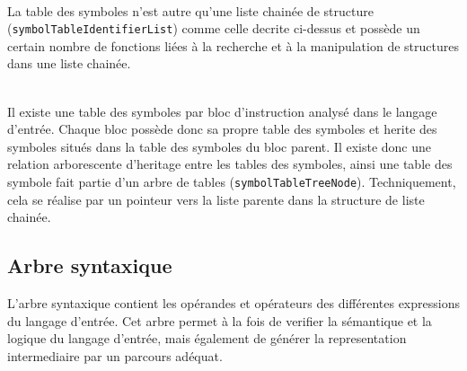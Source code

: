 ~~\\
La table des symboles n'est autre qu'une liste chainée de structure (\verb?symbolTableIdentifierList?) comme celle decrite ci-dessus et possède un certain nombre de fonctions liées à la recherche et à la manipulation de structures dans une liste chainée.

~~\\
Il existe une table des symboles par bloc d'instruction analysé dans le langage d'entrée. Chaque bloc possède donc sa propre table des symboles et herite des symboles situés dans la table des symboles du bloc parent. Il existe donc une relation arborescente d'heritage entre les tables des symboles, ainsi une table des symbole fait partie d'un arbre de tables (\verb?symbolTableTreeNode?). Techniquement, cela se réalise par un pointeur vers la liste parente dans la structure de liste chainée.

\subsection{Arbre syntaxique}

L'arbre syntaxique contient les opérandes et opérateurs des différentes expressions du langage d'entrée. Cet arbre permet à la fois de verifier la sémantique et la logique du langage d'entrée, mais également de générer la representation intermediaire par un parcours adéquat.
